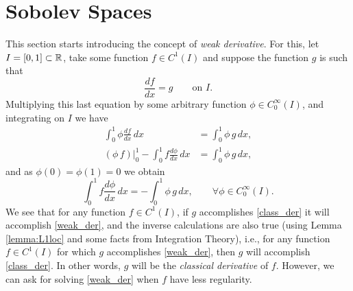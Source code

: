 \section{Sobolev Spaces} This section starts introducing the concept of \emph{weak derivative}. For this, let $I\nobreak=\nobreak[0,1]\nobreak\subset\nobreak \mathbb{R}$, take some function $f\in C^1\left(I\right)$ and suppose the function $g$ is such that 
\begin{equation}
\frac{df}{dx}=g\qquad \text{on }I.\label{eq:class_der}
\end{equation}
Multiplying this last equation by some arbitrary function $\phi \in C_0^\infty(I)$, and integrating on $I$ we have 
\begin{align*}
\int_0^1 \phi \frac{df}{dx}\,dx&=\int_0^1 \phi\,g\,dx, \\
\left(\phi\,f\right)\left.\right|_0^1-\int_0^1 f \frac{d\phi}{dx}\,dx&=\int_0^1 \phi\,g\,dx, 
\end{align*}
and as $\phi(0)=\phi(1)=0$ we obtain
\begin{equation}
\int_0^1 f \frac{d\phi}{dx}\,dx=-\int_0^1 \phi\,g\,dx,\qquad \forall \phi \in C_0^\infty(I).\label{eq:weak_der}
\end{equation}
We see that for any function $f\in C^1(I)$, if $g$ accomplishes \eqref{class_der} it will accomplish \eqref{weak_der}, and the inverse calculations are also true (using Lemma \ref{lemma:L1loc} and some facts from Integration Theory), i.e., for any function $f\in C^1(I)$ for which $g$ accomplishes \eqref{weak_der}, then $g$ will accomplish \eqref{class_der}. In other words, $g$ will be the \emph{classical derivative} of $f$. However, we can ask for solving \eqref{weak_der} when $f$ have less regularity.

